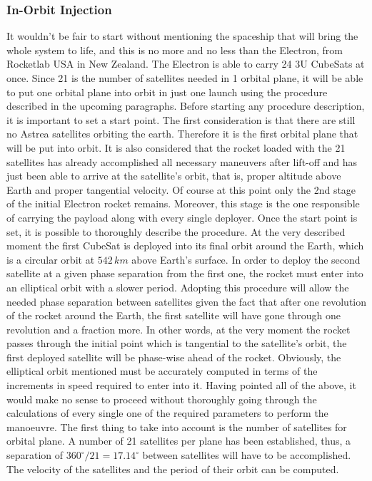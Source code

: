 \subsubsection{In-Orbit Injection}
It wouldn't be fair to start without mentioning the spaceship that will bring the whole system to life, and this is no more and no less than the Electron, from Rocketlab USA in New Zealand. The Electron is able to carry 24 3U CubeSats at once. Since 21 is the number of satellites needed in 1 orbital plane, it will be able to put one orbital plane into orbit in just one launch using the procedure described in the upcoming paragraphs.
\newline\newline
Before starting any procedure description, it is important to set a start point. The first consideration is that there are still no Astrea satellites orbiting the earth. Therefore it is the first orbital plane that will be put into orbit. It is also considered that the rocket loaded with the 21 satellites has already accomplished all necessary maneuvers after lift-off and has just been able to arrive at the satellite's orbit, that is, proper altitude above Earth and proper tangential velocity. Of course at this point only the 2nd stage of the initial Electron rocket remains. Moreover, this stage is the one responsible of carrying the payload along with every single deployer. Once the start point is set, it is possible to thoroughly describe the procedure.
\newline\newline
At the very described moment the first CubeSat is deployed into its final orbit around the Earth, which is a circular orbit at $542 \,km$ above Earth's surface. In order to deploy the second satellite at a given phase separation from the first one, the rocket must enter into an elliptical orbit with a slower period. Adopting this procedure will allow the needed phase separation between satellites given the fact that after one revolution of the rocket around the Earth, the first satellite will have gone through one revolution and a fraction more. In other words, at the very moment the rocket passes through the initial point which is tangential to the satellite's orbit, the first deployed satellite will be phase-wise ahead of the rocket. Obviously, the elliptical orbit mentioned must be accurately computed in terms of the increments in speed required to enter into it.
\newline\newline
Having pointed all of the above, it would make no sense to proceed without thoroughly going through the calculations of every single one of the required parameters to perform the manoeuvre. The first thing to take into account is the number of satellites for orbital plane. A number of 21 satellites per plane has been established, thus, a separation of $360^\circ/21 = 17.14^\circ$ between satellites will have to be accomplished. The velocity of the satellites and the period of their orbit can be computed. %
